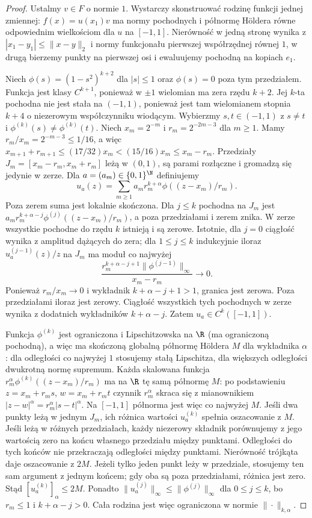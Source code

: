 \begin{proof}
Ustalmy $v\in F$ o normie $1$. Wystarczy
skonstruować rodzinę funkcji jednej zmiennej:
$f(x)=u(x_1)v$ ma normy pochodnych i półnormę
H\"oldera równe odpowiednim wielkościom dla $u$
na $[-1,1]$. Nierówność w jedną stronę
wynika z $|x_1-y_1|\le\|x-y\|_2$ i normy
funkcjonału pierwszej współrzędnej równej $1$,
w drugą bierzemy punkty na pierwszej osi
i ewaluujemy pochodną na kopiach $e_1$.

Niech $\phi(s)=(1-s^2)^{k+2}$ dla $|s|\le1$
oraz $\phi(s)=0$ poza tym przedziałem.
Funkcja jest klasy $C^{k+1}$, ponieważ
w $\pm1$ wielomian ma zera rzędu $k+2$.
Jej $k$-ta pochodna nie jest stała na $(-1,1)$,
ponieważ jest tam wielomianem stopnia $k+4$
o niezerowym współczynniku wiodącym.
Wybierzmy $s,t\in(-1,1)$ z $s\ne t$
i $\phi^{(k)}(s)\ne\phi^{(k)}(t)$.
Niech $x_m=2^{-m}$ i $r_m=2^{-2m-3}$ dla $m\ge1$.
Mamy $r_m/x_m=2^{-m-3}\le1/16$, a więc
$x_{m+1}+r_{m+1}\le(17/32)x_m<(15/16)x_m\le x_m-r_m$.
Przedziały $J_m=[x_m-r_m,x_m+r_m]$ leżą w $(0,1)$,
są parami rozłączne i gromadzą się jedynie w zerze.
Dla $a=(a_m)\in\{0,1\}^{\N}$ definiujemy
\[
 u_a(z)=\sum_{m\ge1}a_m r_m^{k+\alpha}
                         \phi((z-x_m)/r_m).
\]
Poza zerem suma jest lokalnie skończona.
Dla $j\le k$ pochodna na $J_m$ jest
$a_m r_m^{k+\alpha-j}\phi^{(j)}((z-x_m)/r_m)$,
a poza przedziałami i zerem znika.
W zerze wszystkie pochodne do rzędu $k$
istnieją i są zerowe. Istotnie, dla $j=0$
ciągłość wynika z amplitud dążących do zera;
dla $1\le j\le k$ indukcyjnie iloraz
$u_a^{(j-1)}(z)/z$ na $J_m$ ma moduł
co najwyżej
\[
 \frac{r_m^{k+\alpha-j+1}
             \|\phi^{(j-1)}\|_\infty}{x_m-r_m}
 \longrightarrow0.
\]
Ponieważ $r_m/x_m\to0$ i wykładnik
$k+\alpha-j+1>1$, granica jest zerowa.
Poza przedziałami iloraz jest zerowy.
Ciągłość wszystkich tych pochodnych
w zerze wynika z dodatnich wykładników
$k+\alpha-j$. Zatem $u_a\in C^k([-1,1])$.

Funkcja $\phi^{(k)}$ jest ograniczona
i Lipschitzowska na $\R$ (ma ograniczoną
pochodną), a więc ma skończoną globalną
półnormę H\"oldera $M$ dla wykładnika $\alpha$:
dla odległości co najwyżej $1$ stosujemy
stałą Lipschitza, dla większych odległości
dwukrotną normę supremum.
Każda skalowana funkcja
$r_m^\alpha\phi^{(k)}((z-x_m)/r_m)$
ma na $\R$ tę samą półnormę $M$: po podstawieniu
$z=x_m+r_ms$, $w=x_m+r_mt$ czynnik
$r_m^\alpha$ skraca się z mianownikiem
$|z-w|^\alpha=r_m^\alpha|s-t|^\alpha$.
Na $[-1,1]$ półnorma jest więc co najwyżej $M$.
Jeśli dwa punkty leżą w jednym $J_m$,
ich różnica wartości $u_a^{(k)}$ spełnia
oszacowanie z $M$. Jeśli leżą w różnych
przedziałach, każdy niezerowy składnik
porównujemy z jego wartością zero na
końcu własnego przedziału między punktami.
Odległości do tych końców nie przekraczają
odległości między punktami. Nierówność
trójkąta daje oszacowanie z $2M$.
Jeżeli tylko jeden punkt leży w przedziale,
stosujemy ten sam argument z jednym końcem;
gdy oba są poza przedziałami, różnica jest zero.
Stąd $[u_a^{(k)}]_\alpha\le2M$.
Ponadto $\|u_a^{(j)}\|_\infty\le
\|\phi^{(j)}\|_\infty$ dla $0\le j\le k$,
bo $r_m\le1$ i $k+\alpha-j>0$.
Cała rodzina jest więc ograniczona w normie
$\|\cdot\|_{k,\alpha}$.


\end{proof}
